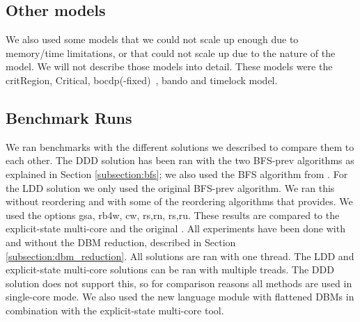 \subsection{Other models}
We also used some models that we could not scale up enough due to memory/time limitations, or that could not scale up due to the nature of the model. We will not describe those models into detail. These models were the critRegion, Critical, bocdp(-fixed)~\cite{641264}, bando and timelock model.

\subsection{Benchmark Runs}
We ran benchmarks with the different solutions we described to compare them to each other. The DDD solution has been ran with the two BFS-prev algorithms as explained in Section \ref{subsection:bfs}; we also used the BFS algorithm from \ltsmin{}. For the LDD solution we only used the original BFS-prev algorithm. We ran this without reordering and with some of the reordering algorithms that \ltsmin{} provides. We used the options gsa, rb4w, cw, rs,rn, rs,ru. These results are compared to the explicit-state multi-core \ltsmin{} and the original \uppaal{}. All experiments have been done with and without the DBM reduction, described in Section \ref{subsection:dbm_reduction}. All solutions are ran with one thread. The LDD and explicit-state multi-core solutions can be ran with multiple treads. The DDD solution does not support this, so for comparison reasons all methods are used in single-core mode. We also used the new language module with flattened DBMs in combination with the explicit-state multi-core tool.
